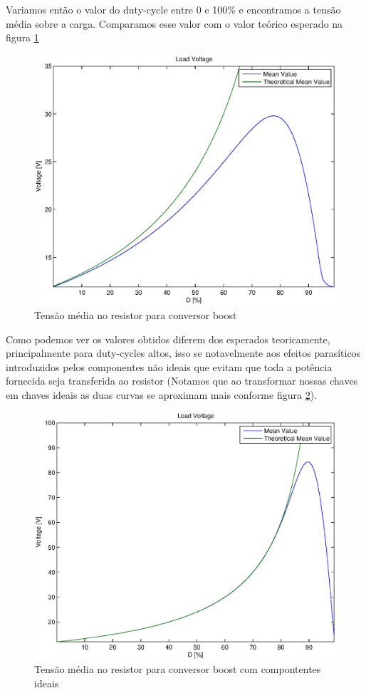 \documentclass{article}
\begin{document}
Variamos então o valor do duty-cycle entre 0 e 100\% e encontramos a tensão média sobre a carga. Comparamos esse valor com o valor teórico esperado na figura \ref{fig:bovrxd}
\begin{figure}[H]
	\centering
	\includegraphics[width=0.7\linewidth]{matlab/boost/r_vrxd}
	\caption{Tensão média no resistor para conversor boost}
	\label{fig:bovrxd}
\end{figure}

Como podemos ver os valores obtidos diferem dos esperados teoricamente, principalmente para duty-cycles altos, isso se notavelmente aos efeitos parasíticos introduzidos pelos componentes não ideais que evitam que toda a potência fornecida seja transferida ao resistor (Notamos que ao transformar nossas chaves em chaves ideais as duas curvas se aproximam mais conforme figura \ref{fig:borvxdi}).
\begin{figure}[H]
	\centering
	\includegraphics[width=0.7\linewidth]{matlab/boost/r_vrxdi}
	\caption{Tensão média no resistor para conversor boost com compontentes ideais}
	\label{fig:borvxdi}
\end{figure}
\end{document}

